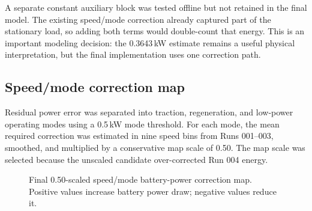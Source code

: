 \documentclass[11pt,letterpaper]{article}
\newcommand{\SI}[2]{#1\,#2}
\begin{document}
A separate constant auxiliary block was tested offline but not retained in the
final model. The existing speed/mode correction already captured part of the
stationary load, so adding both terms would double-count that energy. This is
an important modeling decision: the \SI{0.3643}{kW} estimate remains a useful
physical interpretation, but the final implementation uses one correction path.

\subsection{Speed/mode correction map}

Residual power error was separated into traction, regeneration, and low-power
operating modes using a \SI{0.5}{kW} mode threshold. For each mode, the mean
required correction was estimated in nine speed bins from Runs 001--003,
smoothed, and multiplied by a conservative map scale of 0.50. The map scale was
selected because the unscaled candidate over-corrected Run 004 energy.

\begin{figure}[H]
\centering
{}
\caption{Final 0.50-scaled speed/mode battery-power correction map. Positive values increase battery power draw; negative values reduce it.}
\end{figure}
\end{document}
